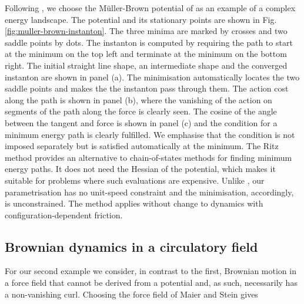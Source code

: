 Following \citep{olender1997yet}, we choose the Müller-Brown potential
of \citep{muller1979location} as an example of a complex energy landscape.
The potential and its stationary points are shown in Fig. \ref{fig:muller-brown-instanton}.
The three minima are marked by crosses and two saddle points by dots.
The instanton is computed by requiring the path to start at the minimum
on the top left and terminate at the minimum on the bottom right.
The initial straight line shape, an intermediate shape and the converged
instanton are shown in panel (a). The minimisation automatically locates
the two saddle points and makes the the instanton pass through them.
The action cost along the path is shown in panel (b), where the vanishing
of the action on segments of the path along the force is clearly seen.
The cosine of the angle between the tangent and force is shown in
panel (c) and the condition for a minimum energy path is clearly fulfilled.
We emphasise that the condition is not imposed separately but is satisfied
automatically at the minimum. The Ritz method provides an alternative
to chain-of-states methods for finding minimum energy paths. It does
not need the Hessian of the potential, which makes it suitable for
problems where such evaluations are expensive. Unlike \citep{heymann2008geometric},
our parametrisation has no unit-speed constraint and the minimisation,
accordingly, is unconstrained. The method applies without change to
dynamics with configuration-dependent friction. 


\subsection{Brownian dynamics in a circulatory field}

For our second example we consider, in contrast to the first, Brownian motion
in a force field that cannot be derived from a potential and, as such,
necessarily has a non-vanishing curl. Choosing the force field of
Maier and Stein \citep{maier1996scaling} gives

